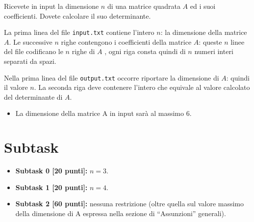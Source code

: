 \renewcommand{\nomebreve}{determinante\_matrice}
\renewcommand{\titolo}{Calcolo Determinante con Ricorsione}

\introduzione{}

Ricevete in input la dimensione $n$ di una matrice quadrata $A$ ed i suoi coefficienti.
Dovete calcolare il suo determinante.

La prima linea del file \verb'input.txt' contiene l'intero $n$: la dimensione della matrice $A$.
Le successive $n$ righe contengono i coefficienti della matrice $A$: queste $n$ linee del file codificano le $n$ righe di $A$ , ogni riga consta quindi di $n$ numeri interi separati da spazi. 
 
Nella prima linea del file \verb'output.txt' occorre riportare la dimensione di $A$: quindi il valore $n$.
La seconda riga deve contenere l'intero che equivale al valore calcolato del determinante di $A$.
   



\begin{itemize}[nolistsep, noitemsep]
  \item La dimensione della matrice A in input sarà al massimo $6$.
\end{itemize}
  
  \section*{Subtask}
  \begin{itemize}    
    \item \textbf{Subtask 0 [20 punti]:} $n=3$.
    \item \textbf{Subtask 1 [20 punti]:} $n=4$.
    \item \textbf{Subtask 2 [60 punti]:} nessuna restrizione (oltre quella sul valore massimo della dimensione di A espressa nella sezione di ``Assunzioni'' generali).
  \end{itemize}

